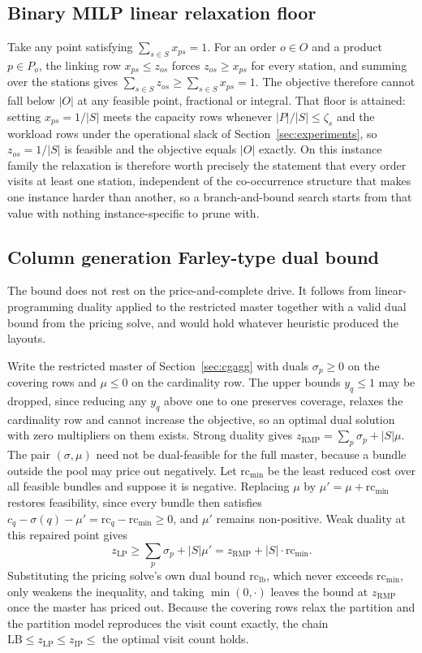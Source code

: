 \documentclass[]{interact}
\begin{document}
\subsection{Binary MILP linear relaxation floor}\label{app:bounds_milp} Take any point satisfying $\sum_{s\in S} x_{ps}=1$. For an order $o \in O$ and a product $p \in P_o$, the linking row $x_{ps}\le z_{os}$ forces $z_{os}\ge x_{ps}$ for every station, and summing over the stations gives $\sum_{s\in S} z_{os}\ge\sum_{s\in S} x_{ps}=1$. The objective therefore cannot fall below $|O|$ at any feasible point, fractional or integral. That floor is attained: setting $x_{ps}=1/|S|$ meets the capacity rows whenever $|P|/|S|\le\zeta_s$ and the workload rows under the operational slack of Section~\ref{sec:experiments}, so $z_{os}=1/|S|$ is feasible and the objective equals $|O|$ exactly. On this instance family the relaxation is therefore worth precisely the statement that every order visits at least one station, independent of the co-occurrence structure that makes one instance harder than another, so a branch-and-bound search starts from that value with nothing instance-specific to prune with.

\subsection{Column generation Farley-type dual bound}\label{app:bounds_cg} The bound does not rest on the price-and-complete drive. It follows from linear-programming duality applied to the restricted master together with a valid dual bound from the pricing solve, and would hold whatever heuristic produced the layouts.

Write the restricted master of Section~\ref{sec:cgagg} with duals $\sigma_p\ge 0$ on the covering rows and $\mu\le 0$ on the cardinality row. The upper bounds $y_q\le 1$ may be dropped, since reducing any $y_q$ above one to one preserves coverage, relaxes the cardinality row and cannot increase the objective, so an optimal dual solution with zero multipliers on them exists. Strong duality gives $z_{\mathrm{RMP}}=\sum_p\sigma_p+|S|\mu$. The pair $(\sigma,\mu)$ need not be dual-feasible for the full master, because a bundle outside the pool may price out negatively. Let $\mathrm{rc}_{\min}$ be the least reduced cost over all feasible bundles and suppose it is negative. Replacing $\mu$ by $\mu'=\mu+\mathrm{rc}_{\min}$ restores feasibility, since every bundle then satisfies $c_q-\sigma(q)-\mu'=\mathrm{rc}_q-\mathrm{rc}_{\min}\ge 0$, and $\mu'$ remains non-positive. Weak duality at this repaired point gives
\begin{equation*}
z_{\mathrm{LP}}\ge\sum_p\sigma_p+|S|\mu'=z_{\mathrm{RMP}}+|S|\cdot\mathrm{rc}_{\min}.
\end{equation*}
Substituting the pricing solve's own dual bound $\mathrm{rc}_{\mathrm{lb}}$, which never exceeds $\mathrm{rc}_{\min}$, only weakens the inequality, and taking $\min(0,\cdot)$ leaves the bound at $z_{\mathrm{RMP}}$ once the master has priced out. Because the covering rows relax the partition and the partition model reproduces the visit count exactly, the chain $\mathrm{LB}\le z_{\mathrm{LP}}\le z_{\mathrm{IP}}\le$ the optimal visit count holds.
\end{document}
